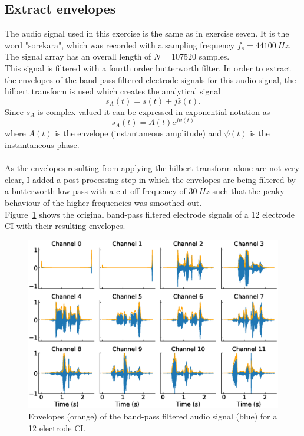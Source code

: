 \documentclass{scrartcl}			%
\begin{document}
\subsection{Extract envelopes}
The audio signal used in this exercise is the same as in exercise seven. It is the word "sorekara", which was recorded with a sampling frequency $f_s=\SI{44100}{Hz}$. The signal array has an overall length of $N=107520$ samples.\\
This signal is filtered with a fourth order butterworth filter.
In order to extract the envelopes of the band-pass filtered electrode signals for this audio signal, the hilbert transform is used which creates the analytical signal 
\begin{equation}
s_A(t) = s(t) + j\hat{s}(t) .
\end{equation}
Since $s_A$ is complex valued it can be expressed in exponential notation as
\begin{equation}
s_A(t) = A(t)e^{j\psi(t)} 
\end{equation}
where $A(t)$ is the envelope (instantaneous amplitude) and $\psi(t)$ is the instantaneous phase.\\
\\
As the envelopes resulting from applying the hilbert transform alone are not very clear, I added a post-processing step in which the envelopes are being filtered by a butterworth low-pass with a cut-off frequency of $\SI{30}{Hz}$ such that the peaky behaviour of the higher frequencies was smoothed out.\\
Figure~\ref{fig:env} shows the original band-pass filtered electrode signals of a 12 electrode CI with their resulting envelopes.

\begin{figure}[H]
\centering
   		 \includegraphics[width=\linewidth]{imgs/envelopes.eps}
   		 \caption{Envelopes (orange) of the band-pass filtered audio signal (blue) for a 12 electrode CI.} 
   		 \label{fig:env} 
\end{figure}
\end{document}
